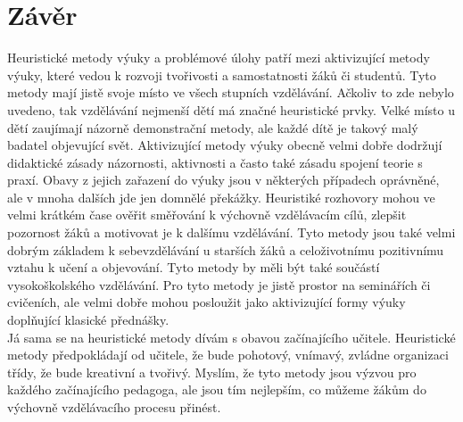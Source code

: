 \chapter{Závěr}

Heuristické metody výuky a problémové úlohy patří mezi aktivizující metody výuky, které vedou k rozvoji tvořivosti a samostatnosti žáků či studentů. Tyto metody mají jistě svoje místo ve všech stupních vzdělávání. Ačkoliv to zde nebylo uvedeno, tak vzdělávání nejmenší dětí má značné heuristické prvky. Velké místo u dětí zaujímají názorně demonstrační metody, ale každé dítě je takový malý badatel objevující svět. Aktivizující metody výuky obecně velmi dobře dodržují didaktické zásady názornosti, aktivnosti a často také zásadu spojení teorie s praxí. Obavy z jejich zařazení do výuky jsou v některých případech oprávněné, ale v mnoha dalších jde jen domnělé překážky. Heuristiké rozhovory mohou ve velmi krátkém čase ověřit směřování k výchovně vzdělávacím cílů, zlepšit pozornost žáků a motivovat je k dalšímu vzdělávání. Tyto metody jsou také velmi dobrým základem k sebevzdělávání u starších žáků a celoživotnímu pozitivnímu vztahu k učení a objevování. Tyto metody by měli být také součástí vysokoškolského vzdělávání. Pro tyto metody je jistě prostor na seminářích či cvičeních, ale velmi dobře mohou posloužit jako aktivizující formy výuky doplňující klasické přednášky.\\

Já sama se na heuristické metody dívám s obavou začínajícího učitele. Heuristické metody předpokládají od učitele, že bude pohotový, vnímavý, zvládne organizaci třídy, že bude kreativní a tvořivý. Myslím, že tyto metody jsou výzvou pro každého začínajícího pedagoga, ale jsou tím nejlepším, co můžeme žákům do výchovně vzdělávacího procesu přinést.\\

